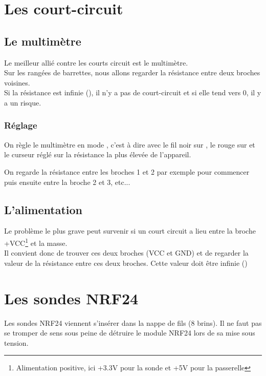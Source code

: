 \section{Les court-circuit}

\subsection{Le multimètre} 

Le meilleur allié contre les courts circuit est le multimètre.\\
Sur les rangées de barrettes, nous allons regarder la résistance entre deux broches voisines. \\
Si la résistance est infinie (), il n'y a pas de court-circuit et si elle tend vers 0, il y a un risque.

\subsubsection{Réglage}

On règle le multimètre en mode , c'est à dire avec le fil noir sur , le rouge sur \bold{$\Omega$} et le curseur réglé sur la résistance la plus élevée de l'appareil.


On regarde la résistance entre les broches 1 et 2 par exemple pour commencer puis ensuite entre la broche 2 et 3, etc...



\subsection{L'alimentation} 

Le problème le plus grave peut survenir si un court circuit a lieu entre la broche +VCC\footnote{Alimentation positive, ici +3.3V pour la sonde et +5V pour la passerelle} et la masse.\\
Il convient donc de trouver ces deux broches (VCC et GND) et de regarder la valeur de la résistance entre ces deux broches. Cette valeur doit être infinie ()

\section{Les sondes NRF24}

Les sondes NRF24 viennent s'insérer dans la nappe de fils (8 brins). Il ne faut pas se tromper de sens sous peine de détruire le module NRF24 lors de sa mise sous tension.

